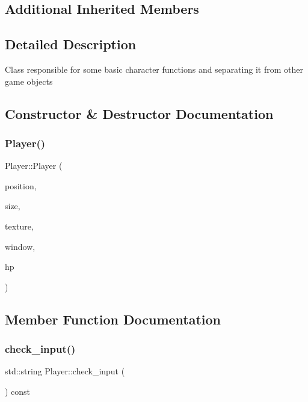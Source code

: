 \subsection*{Additional Inherited Members}


\subsection{Detailed Description}
Class responsible for some basic character functions and separating it from other game objects 

\subsection{Constructor \& Destructor Documentation}
\mbox{\label{classPlayer_a3bd9be84b1533f4ab0a6cb9030ec84da}} 
\subsubsection{\texorpdfstring{Player()}{Player()}}
{\footnotesize\ttfamily Player\+::\+Player (\begin{DoxyParamCaption}\item[{std\+::shared\+\_\+ptr$<$ sf\+::\+Vector2f $>$}]{position,  }\item[{std\+::shared\+\_\+ptr$<$ sf\+::\+Vector2f $>$}]{size,  }\item[{std\+::shared\+\_\+ptr$<$ sf\+::\+Texture $>$}]{texture,  }\item[{sf\+::\+Render\+Window $\ast$}]{window,  }\item[{int}]{hp }\end{DoxyParamCaption})}



\subsection{Member Function Documentation}
\mbox{\label{classPlayer_a25be60a0655359b66a05657d6ccaa537}} 
\subsubsection{\texorpdfstring{check\+\_\+input()}{check\_input()}}
{\footnotesize\ttfamily std\+::string Player\+::check\+\_\+input (\begin{DoxyParamCaption}{ }\end{DoxyParamCaption}) const}

